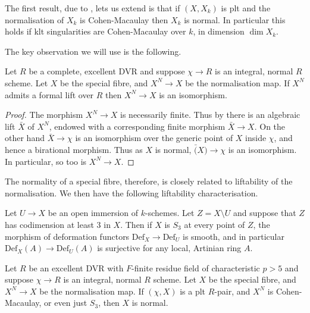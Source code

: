 \documentclass[a4paper,12pt]{book}
\begin{document}
The first result, due to \cite{}, lets us extend \cite{} is that if $(X,X_{k})$ is plt and the normalisation of $X_{k}$ is Cohen-Macaulay then $X_{k}$ is normal. In particular this holds if klt singularities are Cohen-Macaulay over $k$, in dimension $\dim X_{k}$.

The key observation we will use is the following.

\begin{lemma} \label{lift-lemma-1}
	
	Let $R$ be a complete, excellent DVR and suppose $\chi \to R$ is an integral, normal $R$ scheme. Let $X$ be the special fibre, and $X^{N} \to X$ be the normalisation map. If $X^{N}$ admits a formal lift over $R$ then $X^{N} \to X$ is an isomorphism.
	
	\end{lemma}

\begin{proof}
	The morphism $X^{N} \to X$ is necessarily finite. Thus by \cite[Tag 09ZT]{stacks-project} there is an algebraic lift $\bar{X}$ of $X^{N}$, endowed with a corresponding finite morphism $\bar{X} \to X$. On the other hand $\bar{X} \to \chi$ is an isomorphism over the generic point of $X$ inside $\chi$, and hence a birational morphism. Thus as $X$ is normal, $\bar(X)\to \chi$ is an isomorphism. In particular, so too is $X^{N} \to X$.
\end{proof}

The normality of a special fibre, therefore, is closely related to liftability of the normalisation. We then have the following liftability characterisation.

\begin{lemma}\cite[Lemma A.23]{zdanowicz2018liftability}\label{lift-lemma-2}
	
	Let $U \to X$ be an open immersion of $k$-schemes. Let $Z=X \setminus U$ and suppose that $Z$ has codimension at least $3$ in $X$. Then if $X$ is $S_{3}$ at every point of $Z$, the morphism of deformation functors $\text{Def}_{X} \to \text{Def}_{U}$ is smooth, and in particular $\text{Def}_{X}(A) \to \text{Def}_{U}(A)$ is surjective for any local, Artinian ring $A$.  
	
	\end{lemma}

\begin{lemma}\label{adj1}
	
	Let $R$ be an excellent DVR with $F$-finite residue field of characteristic $p> 5$ and suppose $\chi \to R$ is an integral, normal $R$ scheme. Let $X$ be the special fibre, and $X^{N} \to X$ be the normalisation map. If $(\chi,X)$ is a plt $R$-pair, and $X^{N}$ is Cohen-Macaulay, or even just $S_{3}$, then $X$ is normal.
	
	\end{lemma}
\end{document}
